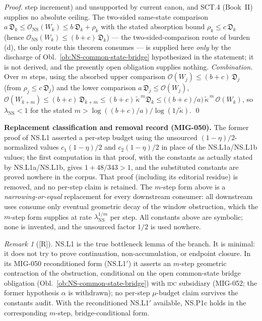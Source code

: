 \documentclass[12pt,oneside]{amsbook}
\theoremstyle{plain}
\theoremstyle{definition}
\theoremstyle{remark}
\newtheorem{remark}[theorem]{Remark}
\newcommand{\status}[1]{\textup{[#1]}}
\begin{document}
\begin{proof}
step increment) and unsupported by current canon, and SCT.4
(Book~II) supplies no absolute ceiling. The two-sided same-state
comparison $a\,\mathfrak{D}_k \leq
\mathcal{O}_{\mathrm{NS}}(W_k) \leq b\,\mathfrak{D}_k + \rho_k$
with the stated absorption bound $\rho_k \leq c\,\mathfrak{D}_k$
(hence $\mathcal{O}_{\mathrm{NS}}(W_k) \leq
(b+c)\,\mathfrak{D}_k$) --- the two-sided-comparison route of
burden (d), the only route this theorem consumes --- is supplied
here \emph{only} by the discharge of
Obl.~\ref{ob:NS-common-state-bridge} hypothesized in the
statement; it is not derived, and the presently open obligation
supplies nothing.
\emph{Combination.} Over $m$ steps, using the absorbed upper
comparison
$\mathcal{O}(W_j) \leq (b+c)\,\mathfrak{D}_j$ (from
$\rho_j \leq c\,\mathfrak{D}_j$) and the lower comparison
$a\,\mathfrak{D}_j \leq \mathcal{O}(W_j)$,
$\mathcal{O}(W_{k+m}) \leq (b+c)\,\mathfrak{D}_{k+m} \leq
(b+c)\,\widetilde\kappa^{\,m}\mathfrak{D}_k \leq
\bigl((b+c)/a\bigr)\,\widetilde\kappa^{\,m}\,\mathcal{O}(W_k)$,
so $\lambda_{\mathrm{NS}} < 1$ for the stated
$m > \log((b+c)/a)/\log(1/\widetilde\kappa)$. \qed
\end{proof}

\medskip\noindent\textbf{Replacement classification and removal
record (MIG-050).} The former proof of NS.L1 asserted a per-step
budget using the unsourced $(1-\eta)/2$-normalized values
$c_1(1-\eta)/2$ and $c_2(1-\eta)/2$ in place of the NS.L1a/NS.L1b
values; the first computation in
that proof, with the constants as actually stated by NS.L1a/NS.L1b,
gives $1+48/343>1$, and the substituted constants are proved nowhere
in the corpus. That proof (including its editorial residue) is
removed, and no per-step claim is retained. The $m$-step form above
is a \emph{narrowing-or-equal} replacement for every downstream
consumer: all downstream uses consume only eventual geometric decay
of the window obstruction, which the $m$-step form supplies at rate
$\lambda_{\mathrm{NS}}^{1/m}$ per step. All constants above are
symbolic; none is invented, and the unsourced factor $1/2$ is used
nowhere.


\begin{remark}[\status{R}]
NS.L1 is the true bottleneck lemma of the branch. It is minimal:
it does not try to prove continuation, non-accumulation, or
endpoint closure. In its MIG-050 reconditioned form (NS.L1$'$) it asserts an
$m$-step geometric contraction of the obstruction, conditional on
the open common-state bridge obligation
(Obl.~\ref{ob:NS-common-state-bridge}) with \textsc{idc}
subsidiary (MIG-052; the former hypothesis $\alpha$ is withdrawn);
no per-step $\mu$-budget claim survives the constants audit. With
the reconditioned NS.L1$'$ available, NS.P1c holds in the
corresponding $m$-step, bridge-conditional form.
\end{remark}
\end{document}
